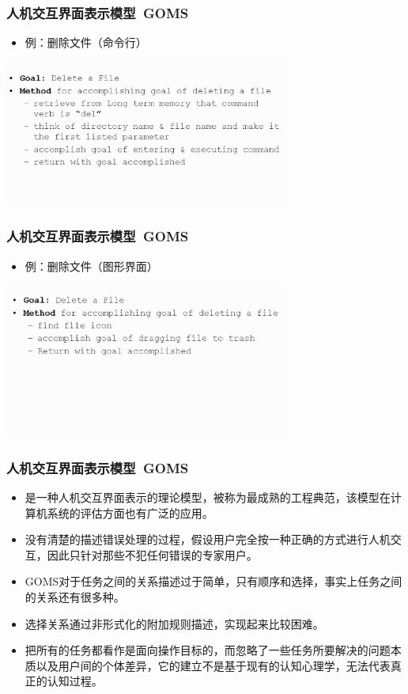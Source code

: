\documentclass{beamer}
\begin{document}
\begin{frame}
	\frametitle{人机交互界面表示模型~{\small GOMS}}
	\beamertemplatetransparentcovereddynamicmedium
	\begin{itemize}
		\item 例：删除文件（命令行）
	\end{itemize}
	\begin{center}
	\includegraphics[width=0.7\textwidth]{images/goms-sample-5.jpg}
	\end{center}
\end{frame}

\begin{frame}
	\frametitle{人机交互界面表示模型~{\small GOMS}}
	\beamertemplatetransparentcovereddynamicmedium
	\begin{itemize}
		\item 例：删除文件（图形界面）
	\end{itemize}
	\begin{center}
	\includegraphics[width=0.7\textwidth]{images/goms-sample-6.jpg}
	\end{center}
\end{frame}

\begin{frame}
	\frametitle{人机交互界面表示模型~{\small GOMS}}
	\beamertemplatetransparentcovereddynamicmedium
	\begin{itemize}[<+->]
		\item 是一种人机交互界面表示的理论模型，被称为最成熟的工程典范，该模型在计算机系统的评估方面也有广泛的应用。
		\item 没有清楚的描述错误处理的过程，假设用户完全按一种正确的方式进行人机交互，因此只针对那些不犯任何错误的专家用户。
		\item GOMS对于任务之间的关系描述过于简单，只有顺序和选择，事实上任务之间的关系还有很多种。
		\item 选择关系通过非形式化的附加规则描述，实现起来比较困难。
		\item 把所有的任务都看作是面向操作目标的，而忽略了一些任务所要解决的问题本质以及用户间的个体差异，它的建立不是基于现有的认知心理学，无法代表真正的认知过程。
	\end{itemize}
\end{frame}
\end{document}
